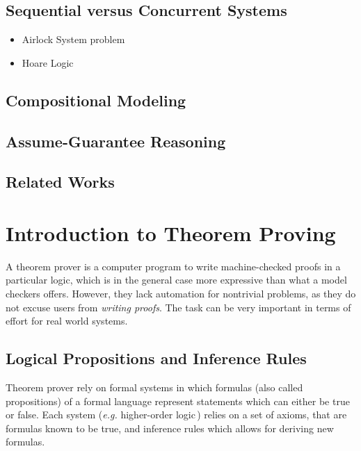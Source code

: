 \documentclass[oneside,a4paper]{memoir}
\theoremstyle{break}
\begin{document}
\subsection{Sequential versus Concurrent Systems}

\begin{itemize}
\item Airlock System problem
\item Hoare Logic
\end{itemize}

\subsection{Compositional Modeling}

\subsection{Assume-Guarantee Reasoning}

\subsection{Related Works}

\section{Introduction to Theorem Proving}

A theorem prover is a computer program to write machine-checked proofs in a
particular logic, which is in the general case more expressive than what a model
checkers offers.
%
However, they lack automation for nontrivial problems, as they do not excuse
users from \emph{writing proofs}.
%
The task can be very important in terms of effort for real world systems.

\subsection{Logical Propositions and Inference Rules}

Theorem prover rely on formal systems in which formulas (also called
propositions) of a formal language represent statements which can either be true
or false.
%
Each system (\emph{e.g.} higher-order logic\,\cite{leivant1994hol}) relies on a
set of axioms, that are formulas known to be true, and inference rules which
allows for deriving new formulas.
\end{document}

